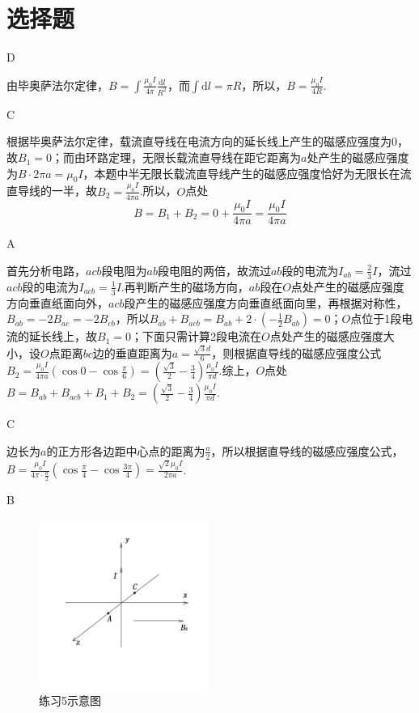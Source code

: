 \documentclass[b5paper,opensource,sourcefont,parskip]{qyxf-book}
\newcommand{\di}[1]{\mathrm{d}#1}
\begin{document}
\section{选择题}

D

\solve
由毕奥萨法尔定律，$B=\int\frac{\mu_0I}{4\pi}\frac{\di l}{R^2}$，而$\int\di l=\pi R$，所以，$B=\frac{\mu_0I}{4R}$.

C

\solve
根据毕奥萨法尔定律，载流直导线在电流方向的延长线上产生的磁感应强度为0，故$B_1=0$；而由环路定理，无限长载流直导线在距它距离为$a$处产生的磁感应强度为$B\cdot2\pi a=\mu_0I$，本题中半无限长载流直导线产生的磁感应强度恰好为无限长在流直导线的一半，故$B_2=\frac{\mu_0I}{4\pi a}$.所以，$O$点处
\begin{equation*}
B=B_1+B_2=0+\frac{\mu_0I}{4\pi a}=\frac{\mu_0I}{4\pi a}
\end{equation*}

A

\solve
首先分析电路，$acb$段电阻为$ab$段电阻的两倍，故流过$ab$段的电流为$I_{ab}=\frac{2}{3}I$，流过$acb$段的电流为$I_{acb}=\frac{1}{3}I$.再判断产生的磁场方向，$ab$段在$O$点处产生的磁感应强度方向垂直纸面向外，$acb$段产生的磁感应强度方向垂直纸面向里，再根据对称性，$B_{ab}=-2B_{ac}=-2B_{cb}$，所以$B_{ab}+B_{acb}=B_{ab}+2\cdot(-\frac{1}{2}B_{ab})=0$；$O$点位于1段电流的延长线上，故$B_1=0$；下面只需计算2段电流在$O$点处产生的磁感应强度大小，设$O$点距离$bc$边的垂直距离为$a=\frac{\sqrt{3}d}{6}$，则根据直导线的磁感应强度公式$B_2=\frac{\mu_0I}{4\pi a}(\cos 0-\cos\frac{\pi}{6})=(\frac{\sqrt{3}}{2}-\frac{3}{4})\frac{\mu_0I}{\pi d}$.综上，$O$点处$B=B_{ab}+B_{acb}+B_1+B_2=(\frac{\sqrt{3}}{2}-\frac{3}{4})\frac{\mu_0I}{\pi d}$.

C

\solve
边长为$a$的正方形各边距中心点的距离为$\frac{a}{2}$，所以根据直导线的磁感应强度公式，$B=\frac{\mu_0I}{4\pi\cdot\frac{a}{2}}(\cos\frac{\pi}{4}-\cos\frac{3\pi}{4})=\frac{\sqrt{2}\mu_0I}{2\pi a}$.

B

\begin{figure}[htbp]  %
	\centering
	\includegraphics[width=15em, height=15em]{Chp8_illus1.jpg}
	\caption{练习5示意图}
	\label{fig:c8-t5}
\end{figure}
\end{document}
